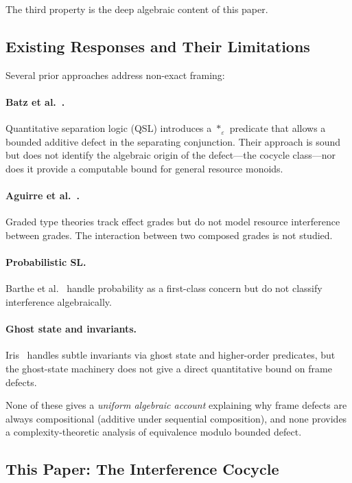 \documentclass[acmsmall,sigplan,anonymous,review,screen]{acmart}
\theoremstyle{plain}
\theoremstyle{definition}
\begin{document}
The third property is the deep algebraic content of this paper.

\subsection{Existing Responses and Their Limitations}
\label{sec:intro:existing}

Several prior approaches address non-exact framing:

\paragraph{Batz et al.~\cite{batz2019quantitative}.}
Quantitative separation logic (QSL) introduces a $*_\varepsilon$
predicate that allows a bounded additive defect in the separating
conjunction.  Their approach is sound but does not identify the
algebraic origin of the defect---the cocycle class---nor does it provide
a computable bound for general resource monoids.

\paragraph{Aguirre et al.~\cite{aguirre2021general}.}
Graded type theories track effect grades but do not model resource
interference between grades.  The interaction between two composed grades
is not studied.

\paragraph{Probabilistic SL.}
Barthe et al.~\cite{barthe2019probabilistic} handle probability as a
first-class concern but do not classify interference algebraically.

\paragraph{Ghost state and invariants.}
Iris~\cite{jung2018iris} handles subtle invariants via ghost state and
higher-order predicates, but the ghost-state machinery does not give a
direct quantitative bound on frame defects.

None of these gives a \emph{uniform algebraic account} explaining why
frame defects are always compositional (additive under sequential
composition), and none provides a complexity-theoretic analysis of
equivalence modulo bounded defect.

\subsection{This Paper: The Interference Cocycle}
\label{sec:intro:this}
\end{document}
